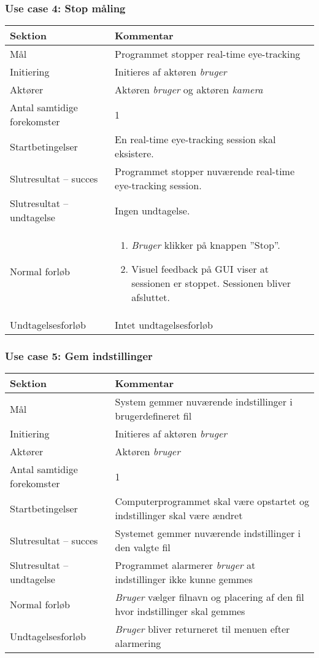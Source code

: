 \documentclass[kravspec.tex]{subfiles}
\begin{document}
	\subsubsection{Use case 4: Stop måling}
		\begin{tabular}{|l|p{7.7cm}|}
			\hline \textbf{Sektion} 	& \textbf{Kommentar} \\ 
			\hline Mål  & Programmet stopper real-time eye-tracking \\ 
			\hline Initiering  & Initieres af aktøren \textit{bruger} \\ 
			\hline Aktører & Aktøren \textit{bruger} og aktøren \textit{kamera} \\ 
			\hline Antal samtidige forekomster & 1 \\ 
			\hline Startbetingelser & En real-time eye-tracking session skal eksistere.   \\ 
			\hline Slutresultat – succes & Programmet stopper nuværende real-time eye-tracking session.\\ 
			\hline Slutresultat – undtagelse & Ingen undtagelse. \\ 
			\hline Normal forløb & \begin{enumerate}
				\item \textit{Bruger} klikker på knappen ”Stop”.
				\item Visuel feedback på GUI viser at sessionen er stoppet. Sessionen bliver afsluttet. 
			\end{enumerate} \\ 
			\hline Undtagelsesforløb & Intet undtagelsesforløb \\ 
			\hline 
		\end{tabular}

	\subsubsection{Use case 5: Gem indstillinger}
	\begin{tabular}{|l|p{7.7cm}|}
		\hline \textbf{Sektion} 	& \textbf{Kommentar} \\ 
		\hline Mål  & System gemmer nuværende indstillinger i brugerdefineret fil \\ 
		\hline Initiering  & Initieres af aktøren \textit{bruger} \\ 
		\hline Aktører & Aktøren \textit{bruger} \\ 
		\hline Antal samtidige forekomster & 1 \\ 
		\hline Startbetingelser & Computerprogrammet skal være opstartet og indstillinger skal være ændret  \\ 
		\hline Slutresultat – succes & Systemet gemmer nuværende indstillinger i den valgte fil \\ 
		\hline Slutresultat – undtagelse & Programmet alarmerer \textit{bruger} at indstillinger ikke kunne gemmes \\ 
		\hline Normal forløb & \textit{Bruger} vælger filnavn og placering af den fil hvor indstillinger skal gemmes \\ 
		\hline Undtagelsesforløb & \textit{Bruger} bliver returneret til menuen efter alarmering \\ 
		\hline 
	\end{tabular}
	
\end{document}
